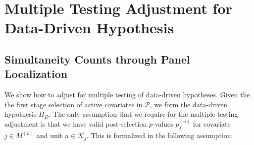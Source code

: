 \documentclass[11pt]{article}
\newcommand{\q}{\text{\quad}}
\newcommand{\NL}{\\[.25cm]}
\newtheorem{definition}{DEFINITION}
\begin{document}






\section{Multiple Testing Adjustment for Data-Driven Hypothesis}\label{sec_multiple_testing}

\subsection{Simultaneity Counts through Panel Localization}

We show how to adjust for multiple testing of data-driven hypotheses. Given the the first stage selection of active covariates in $\mathcal{P}$, we form the data-driven hypothesis $H_D$. The only assumption that we require for the multiple testing adjustment is that we have valid post-selection $p$-values $p_j^{(n)}$ for covariate $j\in M^{(n)}$ and unit $n \in \mathcal{K}_j$. This is formalized in the following assumption: 
\end{document}
